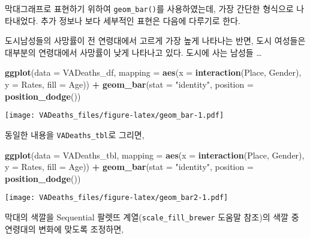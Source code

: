 \documentclass[
]{article}
\newenvironment{Shaded}{\begin{snugshade}}{\end{snugshade}}
\newcommand{\DataTypeTok}[1]{\textcolor[rgb]{0.13,0.29,0.53}{#1}}
\newcommand{\KeywordTok}[1]{\textcolor[rgb]{0.13,0.29,0.53}{\textbf{#1}}}
\newcommand{\NormalTok}[1]{#1}
\newcommand{\OperatorTok}[1]{\textcolor[rgb]{0.81,0.36,0.00}{\textbf{#1}}}
\newcommand{\StringTok}[1]{\textcolor[rgb]{0.31,0.60,0.02}{#1}}
\begin{document}
막대그래프로 표현하기 위하여 \texttt{geom\_bar()}를 사용하였는데, 가장
간단한 형식으로 나타내었다. 추가 정보나 보다 세부적인 표현은 다음에
다루기로 한다.

도시남성들의 사망률이 전 연령대에서 고르게 가장 높게 나타나는 반면, 도시
여성들은 대부분의 연령대에서 사망률이 낮게 나타나고 있다. 도시에 사는
남성들 \ldots{}

\begin{Shaded}
\begin{Highlighting}[]
\KeywordTok{ggplot}\NormalTok{(}\DataTypeTok{data =}\NormalTok{ VADeaths_df,}
              \DataTypeTok{mapping =} \KeywordTok{aes}\NormalTok{(}\DataTypeTok{x =} \KeywordTok{interaction}\NormalTok{(Place, Gender), }
                            \DataTypeTok{y =}\NormalTok{ Rates, }
                            \DataTypeTok{fill =}\NormalTok{ Age)) }\OperatorTok{+}
\KeywordTok{geom_bar}\NormalTok{(}\DataTypeTok{stat =} \StringTok{"identity"}\NormalTok{, }
         \DataTypeTok{position =} \KeywordTok{position_dodge}\NormalTok{())}
\end{Highlighting}
\end{Shaded}

\texttt{[image: VADeaths\_files/figure-latex/geom\_bar-1.pdf]}

동일한 내용을 \texttt{VADeaths\_tbl}로 그리면,

\begin{Shaded}
\begin{Highlighting}[]
\KeywordTok{ggplot}\NormalTok{(}\DataTypeTok{data =}\NormalTok{ VADeaths_tbl,}
              \DataTypeTok{mapping =} \KeywordTok{aes}\NormalTok{(}\DataTypeTok{x =} \KeywordTok{interaction}\NormalTok{(Place, Gender), }
                            \DataTypeTok{y =}\NormalTok{ Rates, }
                            \DataTypeTok{fill =}\NormalTok{ Age)) }\OperatorTok{+}
\KeywordTok{geom_bar}\NormalTok{(}\DataTypeTok{stat =} \StringTok{"identity"}\NormalTok{, }
         \DataTypeTok{position =} \KeywordTok{position_dodge}\NormalTok{())}
\end{Highlighting}
\end{Shaded}

\texttt{[image: VADeaths\_files/figure-latex/geom\_bar2-1.pdf]}

막대의 색깔을 Sequential 팔렛뜨 계열(\texttt{scale\_fill\_brewer} 도움말
참조)의 색깔 중 연령대의 변화에 맞도록 조정하면,
\end{document}
